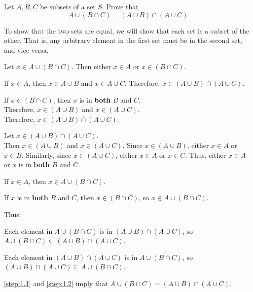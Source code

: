 \begin{problem}
  Let $A, B, C$ be subsets of a set $S$.
  Prove that \[ A \cup (B \cap C) = (A \cup B) \cap (A \cup C)\]
\end{problem}
\begin{answer}
  To show that the two sets are equal, we will show that each set is a subset
  of the other. That is, any arbitrary element in the first set must be in
  the second set, and vice versa.

  \begin{enumroman}
    \item Let $x \in A \cup (B \cap C)$. Then either $x \in A$ or $x \in (B \cap C)$.
      \begin{enumalph}
        \item If $x \in A$, then $x \in A \cup B$ and $x \in A \cup C$.
          Therefore, $x \in (A \cup B) \cap (A \cup C)$.
        \item If $x \in (B \cap C)$, then  $x$ is in \textbf{both} $B$ and $C$. \\
          Therefore, $x \in (A \cup B)$ and $x \in (A \cup C)$. \\ Therefore, $x \in (A \cup B)
          \cap (A \cup C)$.
      \end{enumalph}
  
    \item Let $x \in (A \cup B) \cap (A \cup C)$. \\ Then $x \in (A \cup B)$ and
      $x \in (A \cup C)$.
      Since $x \in (A \cup B)$, either $x \in A$ or $x \in B$.
      Similarly, since $x \in (A \cup C)$, either $x \in A$ or $x \in C$.
      Thus, either $x \in A$ or $x$ is in \textbf{both} $B$ and $C$.
      \begin{enumalph}
        \item If $x \in A$, then $x \in A \cup (B \cap C)$.
        \item If $x$ is in \textbf{both} $B$ and $C$, then $x \in (B \cap C)$,
          so $x \in A \cup (B \cap C)$.
      \end{enumalph}
  \end{enumroman}

  \step
  Thus:
  \begin{enumarabic}
    \item Each element in $A \cup (B \cap C)$ is in $(A \cup B) \cap (A \cup C)$,
      so $A \cup (B \cap C) \subseteq (A \cup B) \cap (A \cup C)$.~\label{step:1.1}
    \item Each element in $(A \cup B) \cap (A \cup C)$ is in $A \cup (B \cap C)$,
      so $(A \cup B) \cap (A \cup C) \subseteq A \cup (B \cap C)$.~\label{step:1.2}
    \item \ref{step:1.1} and \ref{step:1.2} imply that $A \cup (B \cap C) = (A \cup B) \cap (A \cup C)$.
  \end{enumarabic}
\end{answer}
